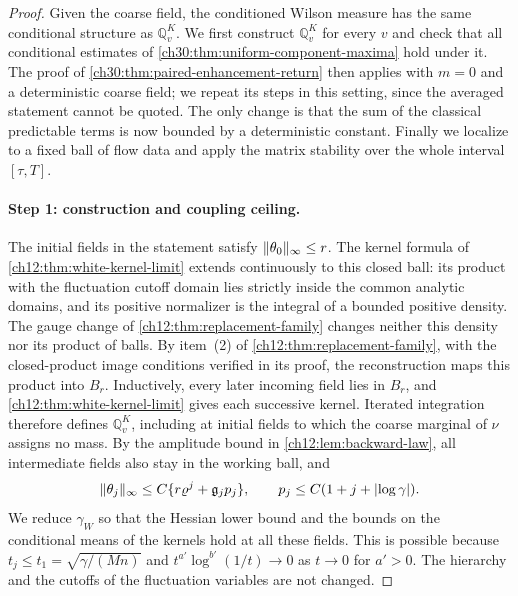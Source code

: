 \begin{proof}
Given the coarse field, the conditioned Wilson measure has the same conditional structure as $\mathbb Q_v^K$. We first construct $\mathbb Q_v^K$ for every $v$ and check that all conditional estimates of \cref{ch30:thm:uniform-component-maxima} hold under it. The proof of \cref{ch30:thm:paired-enhancement-return} then applies with $m=0$ and a deterministic coarse field; we repeat its steps in this setting, since the averaged statement cannot be quoted. The only change is that the sum of the classical predictable terms is now bounded by a deterministic constant. Finally we localize to a fixed ball of flow data and apply the matrix stability over the whole interval $[\tau,T]$.

\paragraph{Step 1: construction and coupling ceiling.} The initial fields in the statement satisfy $\lVert \theta_0\rVert_\infty\le r$. The kernel formula of \cref{ch12:thm:white-kernel-limit} extends continuously to this closed ball: its product with the fluctuation cutoff domain lies strictly inside the common analytic domains, and its positive normalizer is the integral of a bounded positive density. The gauge change of \cref{ch12:thm:replacement-family} changes neither this density nor its product of balls. By item~(2) of \cref{ch12:thm:replacement-family}, with the closed-product image conditions verified in its proof, the reconstruction maps this product into $B_r$. Inductively, every later incoming field lies in $B_r$, and \cref{ch12:thm:white-kernel-limit} gives each successive kernel. Iterated integration therefore defines $\mathbb Q_v^K$, including at initial fields to which the coarse marginal of $\nu$ assigns no mass. By the amplitude bound in \cref{ch12:lem:backward-law}, all intermediate fields also stay in the working ball, and
\[
 \lVert \theta_j\rVert_\infty\le C\{r\varrho^j+\mathfrak g_jp_j\},\qquad p_j\le C(1+j+\lvert \log\gamma\rvert).
\]
We reduce $\gamma_W$ so that the Hessian lower bound and the bounds on the conditional means of the kernels hold at all these fields. This is possible because $t_j\le t_1=\sqrt{\gamma/(Mn)}$ and $t^{a'}\log^{b'}(1/t)\to0$ as $t\to0$ for $a'>0$. The hierarchy and the cutoffs of the fluctuation variables are not changed.


\end{proof}
